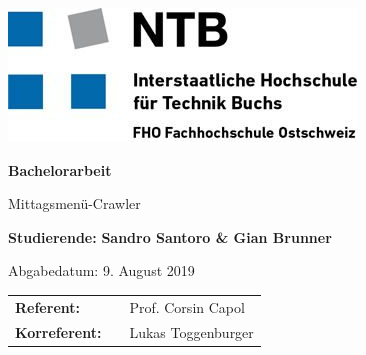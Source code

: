\thispagestyle{empty}

\renewcommand*\chapterpagestyle{scrheadings}
\includegraphics[scale=0.5]{img/ntb.jpg}

\begin{center}
\vspace*{4 cm}
\textbf{\Huge Bachelorarbeit}
\end{center}

\begin{center}
\vspace*{1.5 cm}
\LARGE{\textsf{Mittagsmenü-Crawler\\}}
\end{center}


\begin{center}
\vspace*{2 cm}
\textbf{ Studierende:} {\textbf{Sandro Santoro \& Gian Brunner\\}}
\end{center}

\begin{center}
\vspace*{1 cm}
Abgabedatum: 9. August 2019
\vspace*{1 cm}
\end{center}


\begin{center}
\begin{tabular}{lll}
\textbf{Referent:} & & Prof. Corsin Capol\\
\medskip
\textbf{Korreferent:} & & Lukas Toggenburger\\
\end{tabular}
\end{center}
